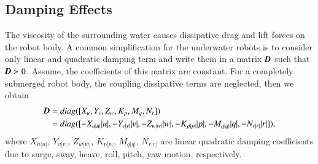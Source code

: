 \subsection{Damping Effects}
The viscosity of the surrounding water causes dissipative drag and lift forces on the robot body. A common simplification for the underwater robots is to consider only linear and quadratic damping term and write them in a matrix $\emph{\textbf{D}}$ such that $\emph{\textbf{D}} \succ 0$.
Assume, the coefficients of this matrix are constant. For a completely submerged robot body, the coupling dissipative terms are neglected, then we obtain
\begin{align}
\emph{\textbf{D}}&=diag([X_{u},Y_{v},Z_{w},K_{p},M_{q},N_{r}]) \nonumber \\
&=diag([-X_{u|u|}|u|,-Y_{v|v|}|v|,-Z_{w|w|}|w|,-K_{p|p|}|p|,-M_{q|q|}|q|,-N_{r|r|}|r|]),\label{EQ:Damping2}
\end{align}
where $X_{u|u|}$, $Y_{v|v|}$, $Z_{w|w|}$, $K_{p|p|}$, $M_{q|q|}$, $N_{r|r|}$ are linear quadratic damping coefficients due to surge, sway, heave, roll, pitch, yaw motion, respectively.
